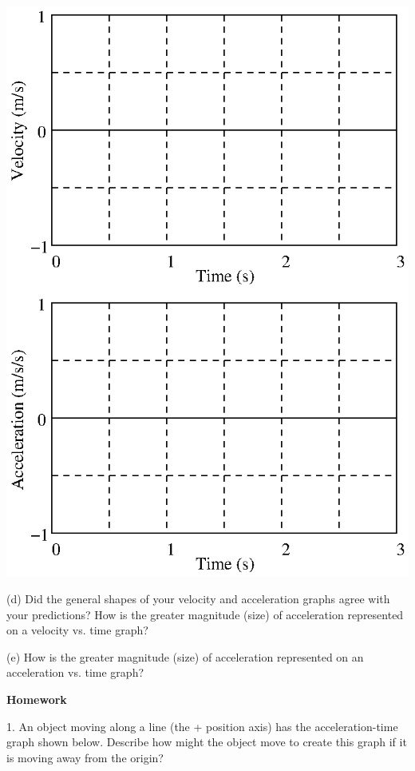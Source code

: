 \vspace{0.3cm}
{\par\centering \includegraphics{changing/changing_fig5.eps} \par}
\vspace{0.3cm}

(d) Did the general shapes of your velocity and acceleration graphs agree with
your predictions? How is the greater magnitude (size) of acceleration represented
on a velocity vs. time graph? 
\vspace{30mm}

(e) How is the greater magnitude (size) of acceleration represented on an acceleration
vs. time graph? 
\vspace{30mm}

\textbf{Homework} 

1. An object moving along a line (the + position axis) has the acceleration-time
graph shown below. Describe how might the object move to create this graph if
it is moving away from the origin?

